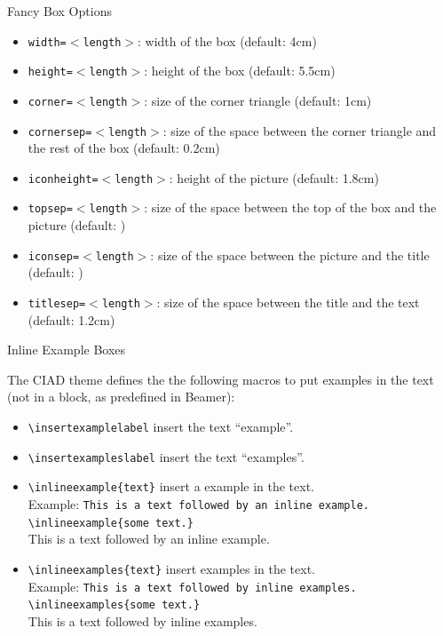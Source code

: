 \documentclass[english,sectioncirclenumberstyle]{ciadbeamer}
\begin{document}
\begin{frame}{{Fancy Box} Options}
	\begin{itemize}
	\item \texttt{width=\ensuremath{<}length\ensuremath{>}}: width of the box (default: 4cm)
	\item \texttt{height=\ensuremath{<}length\ensuremath{>}}: height of the box (default: 5.5cm)
	\item \texttt{corner=\ensuremath{<}length\ensuremath{>}}: size of the corner triangle (default: 1cm)
	\item \texttt{cornersep=\ensuremath{<}length\ensuremath{>}}: size of the space between the corner triangle and the rest of the box (default: 0.2cm)
	\item \texttt{iconheight=\ensuremath{<}length\ensuremath{>}}: height of the picture (default: 1.8cm)
	\item \texttt{topsep=\ensuremath{<}length\ensuremath{>}}: size of the space between the top of the box and the picture (default: \the\bigskipamount)
	\item \texttt{iconsep=\ensuremath{<}length\ensuremath{>}}: size of the space between the picture and the title (default: \the\medskipamount)
	\item \texttt{titlesep=\ensuremath{<}length\ensuremath{>}}: size of the space between the title and the text (default: 1.2cm)
	\end{itemize}
\end{frame}

\begin{frame}{Inline Example Boxes}
	\begin{small}
	The CIAD theme defines the the following macros to put examples in the text (not in a block, as predefined in Beamer):
	\begin{itemize}
	\item \texttt{{\textbackslash}insertexamplelabel} insert the text ``example''.
	\item \texttt{{\textbackslash}insertexampleslabel} insert the text ``examples''.
	\vspace{1em}
	\item \texttt{{\textbackslash}inlineexample\{text\}} insert a example in the text. \\
		Example: \texttt{This is a text followed by an inline example. {\textbackslash}inlineexample\{some text.\}} \\
		This is a text followed by an inline example. 
	\item \texttt{{\textbackslash}inlineexamples\{text\}} insert examples in the text. \\
		Example: \texttt{This is a text followed by inline examples. {\textbackslash}inlineexamples\{some text.\}} \\
		This is a text followed by inline examples. 
	\end{itemize}
	\end{small}
\end{frame}
\end{document}

